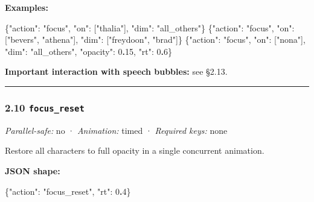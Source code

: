 \documentclass[
  11pt,
]{book}
\newenvironment{Shaded}{}{}
\newcommand{\DataTypeTok}[1]{\textcolor[rgb]{0.56,0.13,0.00}{#1}}
\newcommand{\DecValTok}[1]{\textcolor[rgb]{0.25,0.63,0.44}{#1}}
\newcommand{\ErrorTok}[1]{\textcolor[rgb]{1.00,0.00,0.00}{\textbf{#1}}}
\newcommand{\FunctionTok}[1]{\textcolor[rgb]{0.02,0.16,0.49}{#1}}
\newcommand{\OtherTok}[1]{\textcolor[rgb]{0.00,0.44,0.13}{#1}}
\newcommand{\StringTok}[1]{\textcolor[rgb]{0.25,0.44,0.63}{#1}}
\begin{document}
\textbf{Examples:}

\begin{Shaded}
\begin{Highlighting}[]
\FunctionTok{\{}\DataTypeTok{"action"}\FunctionTok{:} \StringTok{"focus"}\FunctionTok{,} \DataTypeTok{"on"}\FunctionTok{:} \OtherTok{[}\StringTok{"thalia"}\OtherTok{]}\FunctionTok{,} \DataTypeTok{"dim"}\FunctionTok{:} \StringTok{"all\_others"}\FunctionTok{\}}
\FunctionTok{\{}\DataTypeTok{"action"}\FunctionTok{:} \StringTok{"focus"}\FunctionTok{,} \DataTypeTok{"on"}\FunctionTok{:} \OtherTok{[}\StringTok{"bevers"}\OtherTok{,} \StringTok{"athena"}\OtherTok{]}\FunctionTok{,} \DataTypeTok{"dim"}\FunctionTok{:} \OtherTok{[}\StringTok{"freydoon"}\OtherTok{,} \StringTok{"brad"}\OtherTok{]}\FunctionTok{\}}
\FunctionTok{\{}\DataTypeTok{"action"}\FunctionTok{:} \StringTok{"focus"}\FunctionTok{,} \DataTypeTok{"on"}\FunctionTok{:} \OtherTok{[}\StringTok{"nona"}\OtherTok{]}\FunctionTok{,} \DataTypeTok{"dim"}\FunctionTok{:} \StringTok{"all\_others"}\FunctionTok{,} \DataTypeTok{"opacity"}\FunctionTok{:} \DecValTok{0}\ErrorTok{.}\DecValTok{15}\FunctionTok{,} \DataTypeTok{"rt"}\FunctionTok{:} \DecValTok{0}\ErrorTok{.}\DecValTok{6}\FunctionTok{\}}
\end{Highlighting}
\end{Shaded}

\textbf{Important interaction with speech bubbles:} see §2.13.

\begin{center}\rule{0.5\linewidth}{0.5pt}\end{center}

\subsubsection{\texorpdfstring{2.10
\texttt{focus\_reset}}{2.10 focus\_reset}}\label{focus_reset}

\emph{Parallel-safe:} no · \emph{Animation:} timed · \emph{Required
keys:} none

Restore all characters to full opacity in a single concurrent animation.

\textbf{JSON shape:}

\begin{Shaded}
\begin{Highlighting}[]
\FunctionTok{\{}\DataTypeTok{"action"}\FunctionTok{:} \StringTok{"focus\_reset"}\FunctionTok{,} \DataTypeTok{"rt"}\FunctionTok{:} \DecValTok{0}\ErrorTok{.}\DecValTok{4}\FunctionTok{\}}
\end{Highlighting}
\end{Shaded}
\end{document}
